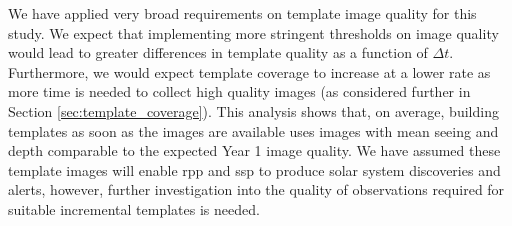 \documentclass[preprintm,linenumbers]{aastex631}
\begin{document}
  We have applied very broad requirements on template image quality for this study. 
  We expect that implementing more stringent thresholds on image quality would lead to greater differences in template quality as a function of $\Delta t$.
  Furthermore, we would expect template coverage to increase at a lower rate as more time is needed to collect high quality images (as considered further in Section \ref{sec:template_coverage}).
This analysis shows that, on average, building templates as soon as the images are available uses images with mean seeing and depth comparable to the  expected Year 1 image quality.
We have assumed these template images will enable \gls*{rpp} and \gls*{ssp} to produce solar system discoveries and alerts, however, further investigation into the quality of observations required for suitable incremental templates is needed. 
\end{document}
